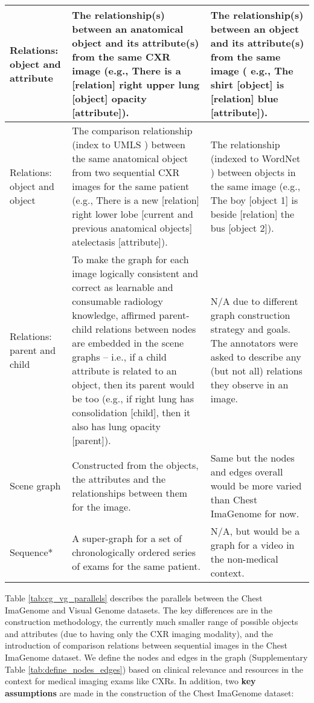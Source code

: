 \begin{table}[!ht]
{\begin{tabular}{|p{4em}|p{21em}|p{16em}|}
    \midrule
    Relations: object and attribute & The relationship(s) between an anatomical object and its attribute(s) from the same CXR image (e.g., There is a [relation] right upper lung [object] opacity [attribute]). & The relationship(s)  between an object and its attribute(s) from the same image ( e.g., The shirt [object] is [relation] blue [attribute]). \\
    \midrule
    Relations: object and object & The comparison relationship (index to UMLS \cite{bodenreider2004unified}) between the same anatomical object from two sequential CXR images for the same patient (e.g., There is a new [relation] right lower lobe [current and previous anatomical objects] atelectasis [attribute]). & The relationship (indexed to WordNet \cite{miller1995wordnet}) between objects in the same image (e.g., The boy [object 1] is beside [relation] the bus [object 2]). \\
    \midrule
    Relations: parent and child & To make the graph for each image logically consistent and correct as learnable and consumable radiology knowledge, affirmed parent-child relations between nodes are embedded in the scene graphs -- i.e., if a child attribute is related to an object, then its parent would be too (e.g., if right lung has consolidation [child], then it also has lung opacity [parent]). & N/A due to different graph construction strategy and goals. The annotators were asked to describe any (but not all) relations they observe in an image. \\
    \midrule
    Scene graph & Constructed from the objects, the attributes and the relationships between them for the image. & Same but the nodes and edges overall would be more varied than Chest ImaGenome for now. \\
    \midrule
    Sequence* & A super-graph for a set of chronologically ordered series of exams for the same patient. & N/A, but would be a graph for a video in the non-medical context. \\
    \bottomrule
    \end{tabular}%
    }
    \vspace{-15pt}
\end{table}

Table \ref{tab:cg_vg_parallels} describes the parallels between the Chest ImaGenome and Visual Genome datasets. The key differences are in the construction methodology, the currently much smaller range of possible objects and attributes (due to having only the CXR imaging modality), and the introduction of comparison relations between sequential images in the Chest ImaGenome dataset. We define the nodes and edges in the graph (Supplementary Table \ref{tab:define_nodes_edges}) based on clinical relevance and resources in the context for medical imaging exams like CXRs. In addition, two \textbf{key assumptions} are made in the construction of the Chest ImaGenome dataset: 


